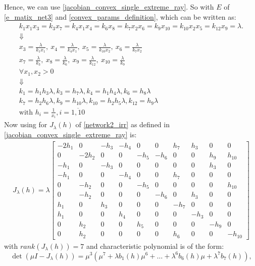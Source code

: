 Hence, we can use \ref{jacobian_convex_single_extreme_ray}. So with $E$ of \ref{e_matix_net3} and \ref{convex_params_definition}, which can be written as:
\begin{gather*}
	k_1x_1x_3=k_3x_7=k_4x_1x_4=k_6x_8=k_7x_2x_6=k_9x_{10}=k_{10}x_2x_5=k_{12}x_9=\lambda. \\
	\Downarrow \\
	x_{3} = \frac{\lambda}{k_{1} x_{1}}, \ x_{4} = \frac{\lambda}{k_{4} x_{1}}, \ x_{5} = \frac{\lambda}{k_{10} x_{2}}, \ x_{6} = \frac{\lambda}{k_{7} x_{2}} \\
	x_{7} = \frac{\lambda}{k_{3}}, \ x_{8} = \frac{\lambda}{k_{6}}, \ x_{9} = \frac{\lambda}{k_{12}}, \ x_{10} = \frac{\lambda}{k_{9}} \\
	\forall x_1, x_2 > 0 \\
	\Downarrow \\
	k_{1} = h_{1} h_{3} \lambda, k_{3} = h_{7} \lambda, k_{4} = h_{1} h_{4} \lambda, k_{6} = h_{8} \lambda \\
	k_{7} = h_{2} h_{6} \lambda, k_{9} = h_{10} \lambda, k_{10} = h_{2} h_{5} \lambda, k_{12} = h_{9} \lambda \\
	\text{with } h_i = \frac{1}{x_i} , i = \overline{1,10}
\end{gather*}
Now using \cite{franz2016ConvexMaple} for $J_\lambda(h)$ of \ref{network2_irr} as defined in \ref{jacobian_convex_single_extreme_ray} is:
\begin{align}
	J_\lambda(h) = \lambda
	\left.\left[
		\begin{array}{rrrrrrrrrr}-2h_{1}&0&-h_{3}&-h_{4}&0&0&h_{7}&h_{3}&0&0\\0&-2h_{2}&0&0&-h_{5}&-h_{6}&0&0&h_{9}&h_{10}\\-h_{1}&0&-h_{3}&0&0&0&0&0&h_{3}&0\\-h_{1}&0&0&-h_{4}&0&0&h_{7}&0&0&0\\0&-h_{2}&0&0&-h_{5}&0&0&0&0&h_{10}\\0&-h_{2}&0&0&0&-h_{6}&0&h_{3}&0&0\\h_{1}&0&h_{3}&0&0&0&-h_{7}&0&0&0\\h_{1}&0&0&h_{4}&0&0&0&-h_{3}&0&0\\0&h_{2}&0&0&h_{5}&0&0&0&-h_{9}&0\\0&h_{2}&0&0&0&0&h_{6}&0&0&-h_{10}
	\end{array}\right.\right]
\end{align}
with $rank(J_\lambda(h)) = 7$ and characteristic polynomial is of the form:
\[
	\det\left(\mu I-J_\lambda(h)\right)=\mu^3\left(\mu^7+\lambda b_1(h)\mu^6+\ldots+\lambda^6b_6(h)\mu+\lambda^7b_7(h)\right),
\]
